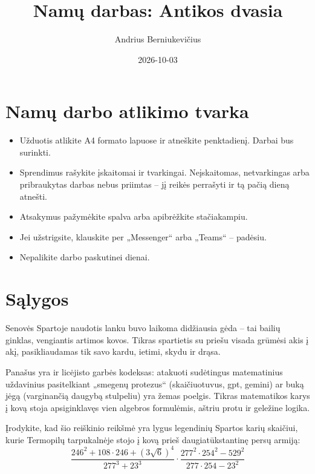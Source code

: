 \documentclass[12pt, a4paper]{scrartcl}
\title{\textbf{Namų darbas: Antikos dvasia}}
\author{Andrius Berniukevičius}
\date{2026-10-03}
\begin{document}
\maketitle

\section*{Namų darbo atlikimo tvarka}

\begin{itemize}[leftmargin=*]
    \item Užduotis atlikite A4 formato lapuose ir atneškite penktadienį. Darbai bus surinkti.
    \item Sprendimus rašykite įskaitomai ir tvarkingai. Neįskaitomas, netvarkingas arba pribraukytas darbas nebus priimtas – jį reikės perrašyti ir tą pačią dieną atnešti.
    \item Atsakymus pažymėkite spalva arba apibrėžkite stačiakampiu.
    \item Jei užstrigsite, klauskite per „Messenger“ arba „Teams“ – padėsiu.
    \item Nepalikite darbo paskutinei dienai.
\end{itemize}

\section{Sąlygos}

\begin{problem}
Senovės Spartoje naudotis lanku buvo laikoma didžiausia gėda – tai bailių
ginklas, vengiantis artimos kovos. Tikras spartietis su priešu visada grūmėsi
akis į akį, pasikliaudamas tik savo kardu, ietimi, skydu ir drąsa.

Panašus yra ir licėjisto garbės kodeksas: atakuoti
sudėtingus matematinius uždavinius pasitelkiant „smegenų protezus“ (skaičiuotuvus, gpt, gemini)
ar buką jėgą (varginančią daugybą stulpeliu) yra žemas poelgis. Tikras
matematikos karys į kovą stoja apsiginklavęs vien algebros formulėmis, aštriu protu ir geležine logika.

Įrodykite, kad šio reiškinio reikšmė yra lygus legendinių Spartos karių
skaičiui, kurie Termopilų tarpukalnėje stojo į  kovą prieš
daugiatūkstantinę persų armiją:
\[
\frac{246^2+108\cdot246+(3\sqrt{6})^4}{277^3+23^3}
\cdot
\frac{277^2\cdot254^2-529^2}{277\cdot254-23^2}
\]
\end{problem}
\end{document}
